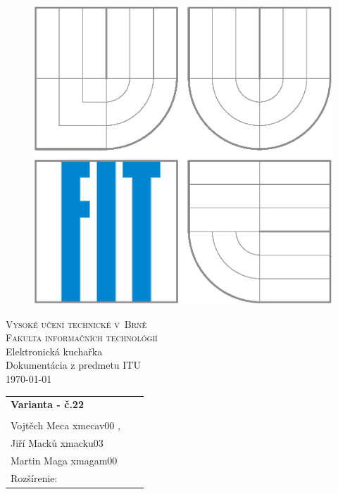 \begin{titlepage}

\begin{figure}[h]
\begin{center}
\includegraphics[scale=0.6]{logo.eps}
\end{center}
\end{figure}

\begin{center}
\LARGE
\textsc{Vysoké učení
  technické v~Brně\\ \Large{Fakulta informačních technológií}}\\
\LARGE
Elektronická kuchařka \\
\Huge
Dokumentácia z predmetu ITU\\ 
\large{\medskip
\today }\\
\end{center}
 \hfill   

\begin{flushleft}
\begin{large}
\begin{tabular}{ll}
\textbf{Varianta - č.22} \\ 


 \\Vojtěch Meca   xmecav00 , \ \\ Jiří Macků  xmacku03 \\ Martin Maga xmagam00\\
Rozšírenie:


\end{tabular}
\end{large}
\end{flushleft}
\end{titlepage}
